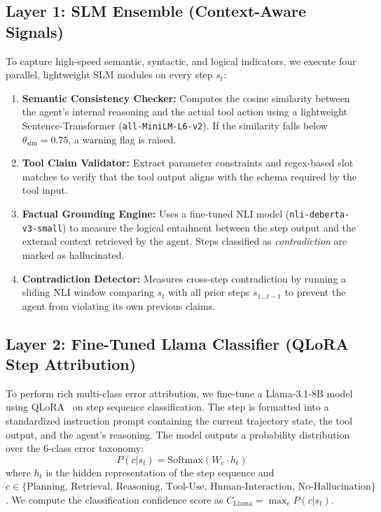 \documentclass[11pt,a4paper]{article}
\begin{document}
\subsection{Layer 1: SLM Ensemble (Context-Aware Signals)}
To capture high-speed semantic, syntactic, and logical indicators, we execute four parallel, lightweight SLM modules on every step $s_t$:
\begin{enumerate}
    \item \textbf{Semantic Consistency Checker:} Computes the cosine similarity between the agent's internal reasoning and the actual tool action using a lightweight Sentence-Transformer (\texttt{all-MiniLM-L6-v2}). If the similarity falls below $\theta_{\text{sim}} = 0.75$, a warning flag is raised.
    \item \textbf{Tool Claim Validator:} Extract parameter constraints and regex-based slot matches to verify that the tool output aligns with the schema required by the tool input.
    \item \textbf{Factual Grounding Engine:} Uses a fine-tuned NLI model (\texttt{nli-deberta-v3-small}) to measure the logical entailment between the step output and the external context retrieved by the agent. Steps classified as \textit{contradiction} are marked as hallucinated.
    \item \textbf{Contradiction Detector:} Measures cross-step contradiction by running a sliding NLI window comparing $s_t$ with all prior steps $s_{1 \dots t-1}$ to prevent the agent from violating its own previous claims.
\end{enumerate}

\subsection{Layer 2: Fine-Tuned Llama Classifier (QLoRA Step Attribution)}
To perform rich multi-class error attribution, we fine-tune a Llama-3.1-8B model using QLoRA~\cite{qlora2023} on step sequence classification. The step is formatted into a standardized instruction prompt containing the current trajectory state, the tool output, and the agent's reasoning. The model outputs a probability distribution over the 6-class error taxonomy:
\begin{equation}
    P(c | s_t) = \text{Softmax}(W_c \cdot h_t)
\end{equation}
where $h_t$ is the hidden representation of the step sequence and $c \in \{ \text{Planning, Retrieval, Reasoning, Tool-Use, Human-Interaction, No-Hallucination} \}$. We compute the classification confidence score as $C_{\text{Llama}} = \max_c P(c | s_t)$.
\end{document}
